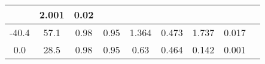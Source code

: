 \documentclass[a4paper,10pt]{article}
\begin{document}
\begin{longtable}{
     |
%    
    c|
%    
    c|
%    
    c|
%    
    c|
%    
    c|
%    
    c|
%    
    c|
%    
    c|
%    
    c|
%    
    }
%        
        & 2.001
%        

%        

%        
        & 0.02
%        

%        
        \\
        \hline

        

%        

%        
        -40.4
%        

%        

%        
        & 57.1
%        

%        

%        
        & 0.98
%        

%        

%        
        & 0.95
%        

%        

%        
        & 1.364
%        

%        

%        
        & 0.473
%        

%        

%        
        & 1.737
%        

%        

%        
        & 0.017
%        

%        
        \\
        \hline

        

%        

%        
        0.0
%        

%        

%        
        & 28.5
%        

%        

%        
        & 0.98
%        

%        

%        
        & 0.95
%        

%        

%        
        & 0.63
%        

%        

%        
        & 0.464
%        

%        

%        
        & 0.142
%        

%        

%        
        & 0.001
%        

%        
        \\
        \hline


\end{longtable}
\end{document}
